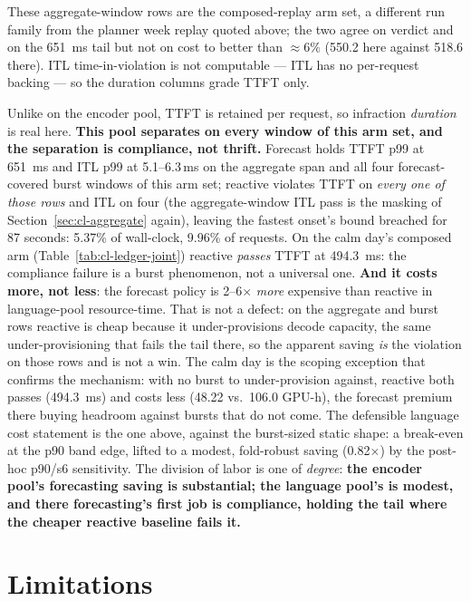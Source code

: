 \begin{table}[htbp]
\vspace{2pt}
{\footnotesize These aggregate-window rows are the composed-replay arm set, a
different run family from the planner week replay quoted above; the two agree
on verdict and on the \SI{651}{\milli\second} tail but not on cost to better
than ${\approx}6\%$ (550.2 here against 518.6 there). ITL time-in-violation is
not computable --- ITL has no per-request backing --- so the duration columns
grade TTFT only.}
\end{table}

Unlike on the encoder pool, TTFT is retained per request, so infraction \emph{duration}
is real here. \textbf{This pool separates on every window of this arm set,
and the separation is compliance, not thrift.} Forecast holds TTFT p99 at \SI{651}{\milli\second}
and ITL p99 at 5.1--6.3\,\si{\milli\second} on the aggregate span and all
four forecast-covered burst windows of this arm
set; reactive violates TTFT on \emph{every one of those rows} and ITL on four (the
aggregate-window ITL pass is the masking of Section~\ref{sec:cl-aggregate}
again), leaving the fastest onset's bound breached for 87 seconds: 5.37\% of
wall-clock, 9.96\% of requests. On the calm day's composed arm
(Table~\ref{tab:cl-ledger-joint}) reactive \emph{passes} TTFT at
\SI{494.3}{\milli\second}: the compliance failure is a burst phenomenon,
not a universal one.
\textbf{And it costs more, not less}: the forecast policy is 2--6$\times$
\emph{more} expensive than reactive in language-pool resource-time. That is not
a defect: on the aggregate and burst rows reactive is cheap
because it under-provisions decode capacity, the same under-provisioning that
fails the tail there, so the apparent saving \emph{is} the violation on those
rows and is not a win. The calm day is the scoping
exception that confirms the mechanism: with no burst to under-provision
against, reactive both passes (\SI{494.3}{\milli\second}) and costs less
(48.22 vs.\ 106.0 GPU-h), the forecast premium there buying headroom
against bursts that do not come. The
defensible language cost statement is the one above, against the burst-sized
static shape: a break-even at the p90 band edge, lifted to a modest,
fold-robust
saving (0.82$\times$) by the post-hoc p90/s6 sensitivity. The division of
labor is one of \emph{degree}: \textbf{the encoder pool's forecasting saving
is substantial; the language pool's is modest, and there forecasting's first
job is compliance, holding the tail where the cheaper reactive baseline
fails it.}

\section{Limitations}
\label{sec:cl-limits}

